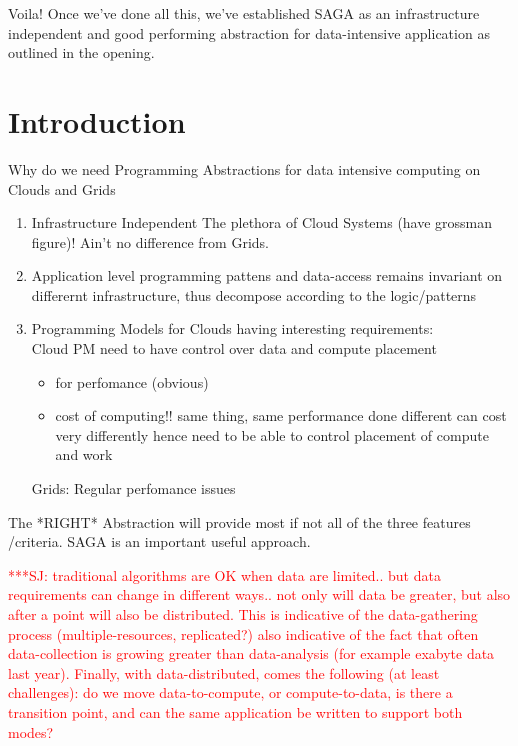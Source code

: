 \documentclass[conference,final]{IEEEtran}
\newcommand{\jhanote}[1]{ {\textcolor{red} { ***SJ: #1 }}}
\newcommand{\jhanote}[1]{}
\begin{document}
Voila! Once we've done all this, we've established SAGA as an
infrastructure independent and good performing abstraction for
data-intensive application as outlined in the opening.

\section{Introduction} 

Why do we need Programming Abstractions for data intensive computing
on Clouds and Grids

\begin{enumerate}
\item  Infrastructure Independent
   The plethora of Cloud Systems (have grossman figure)!
   Ain't no difference from Grids.

\item Application level programming pattens and data-access remains
invariant on differernt infrastructure, thus decompose
according to the logic/patterns

\item  Programming Models for Clouds having interesting
requirements:\\
Cloud PM  need to have control over data and compute placement

\begin{itemize}
 \item for perfomance (obvious)
 \item cost of computing!!
       same thing, same performance done different can cost very differently
       hence need to be able to control placement of compute and work
\end{itemize}

Grids: Regular perfomance issues
\end{enumerate}

The *RIGHT* Abstraction will provide most if not all of the three features
/criteria. SAGA is an important useful approach.


\jhanote{traditional algorithms are OK when data are limited.. but
  data requirements can change in different ways.. not only will data
  be greater, but also after a point will also be distributed. This is
  indicative of the data-gathering process (multiple-resources,
  replicated?) also indicative of the fact that often data-collection
  is growing greater than data-analysis (for example exabyte data last
  year).  Finally, with data-distributed, comes the following (at
  least challenges): do we move data-to-compute, or compute-to-data,
  is there a transition point, and can the same application be written
  to support both modes?}
\end{document}
